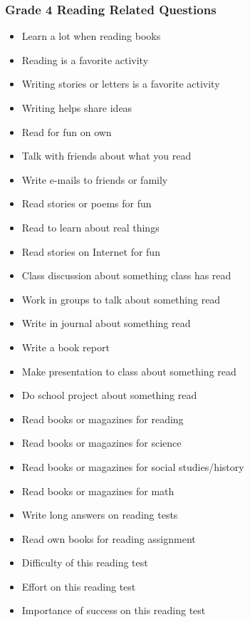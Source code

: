 \documentclass[letterpaper,12pt]{article}
\begin{document}
\begin{singlespace}
\subsubsection{Grade 4 Reading Related Questions}
\begin{itemize}
	\item Learn a lot when reading books
	\item Reading is a favorite activity
	\item Writing stories or letters is a favorite activity
	\item Writing helps share ideas
	\item Read for fun on own
	\item Talk with friends about what you read
	\item Write e-mails to friends or family
	\item Read stories or poems for fun
	\item Read to learn about real things
	\item Read stories on Internet for fun
	\item Class discussion about something class has read
	\item Work in groups to talk about something read
	\item Write in journal about something read
	\item Write a book report
	\item Make presentation to class about something read
	\item Do school project about something read
	\item Read books or magazines for reading
	\item Read books or magazines for science
	\item Read books or magazines for social studies/history
	\item Read books or magazines for math
	\item Write long answers on reading tests
	\item Read own books for reading assignment
	\item Difficulty of this reading test
	\item Effort on this reading test
	\item Importance of success on this reading test
\end{itemize}


\end{singlespace}
\end{document}
